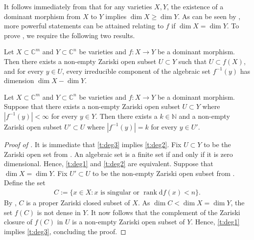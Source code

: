 \documentclass[ALCO]{cedram}
\DeclareMathOperator{\rank}{rank}
\newcommand{\diff}{\mathrm{d}}
\begin{document}
It follows immediately from  that for any varieties $X,Y$,
the existence of a dominant morphism from $X$ to $Y$ implies $\dim X \geq \dim Y$.
As can be seen by ,
more powerful statements can be attained relating to $f$ if $\dim X=\dim Y$.
To prove , we require the following two results.

\begin{corollary}\label{mumford}
	Let $X \subset \mathbb{C}^m$ and $Y \subset \mathbb{C}^n$ be varieties and $f:X \rightarrow Y$ be a dominant morphism.
	Then there exists a non-empty Zariski open subset $U \subset Y$ such that $U \subset f(X)$, and for every $y \in U$, every irreducible component of the algebraic set $f^{-1}(y)$ has dimension $\dim X - \dim Y$.
\end{corollary}

\begin{corollary}\label{c:harris}
	Let $X \subset \mathbb{C}^m$ and $Y \subset \mathbb{C}^n$ be varieties and $f:X \rightarrow Y$ be a dominant morphism.
	Suppose that there exists a non-empty Zariski open subset $U \subset Y$ where $|f^{-1}(y)|<\infty$ for every $y \in Y$.
	Then there exists a $k \in \mathbb{N}$ and a non-empty Zariski open subset $U' \subset U$ where $|f^{-1}(y)| = k$ for every $y \in U'$.
\end{corollary}

\begin{proof}[Proof of ]
	It is immediate that \ref{t:deg3} implies \ref{t:deg2}.
	Fix $U \subset Y$ to be the Zariski open set from .
	An algebraic set is a finite set if and only if it is zero dimensional.
	Hence, \ref{t:deg1} and \ref{t:deg2} are equivalent.
	Suppose that $\dim X=\dim Y$.
	Fix $U' \subset U$ to be the non-empty Zariski open subset from .
	Define the set
	\begin{align*}
		C := \{x \in X : x \text{ is singular or } \rank \diff f(x) <n\}.
	\end{align*}
	By ,
	$C$ is a proper Zariski closed subset of $X$.
	As $\dim C < \dim X = \dim Y$,
	the set $f(C)$ is not dense in $Y$.
	It now follows that the complement of the Zariski closure of $f(C)$ in $U$ is a non-empty Zariski open subset of $Y$.
	Hence, \ref{t:deg1} implies \ref{t:deg3},
	concluding the proof.
\end{proof}
\end{document}
